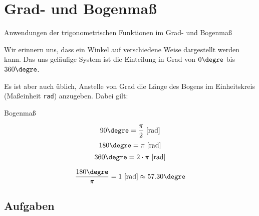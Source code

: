 
\section{Grad- und Bogenmaß}

Anwendungen der trigonometrischen Funktionen im Grad- und Bogenmaß

Wir erinnern uns, dass ein Winkel auf verschiedene Weise dargestellt
werden kann. Das uns geläufige System ist die Einteilung in Grad von
$0\degre$ bis $360\degre$.

Es ist aber auch üblich, Anstelle von Grad die Länge des Bogens im
Einheitskreis (Maßeinheit \texttt{rad}) anzugeben. Dabei gilt:

\begin{gesetz}{Bogenmaß}{}
  
  $$90\degre=\frac{\pi}2 \textrm{ [rad]}$$
  $$180\degre=\pi\textrm{ [rad]}$$
  $$360\degre=2\cdot{}\pi \textrm{ [rad]}$$

  $$\frac{180\degre}{\pi}  =1 \textrm{ [rad]} \approx{} 57.30\degre$$
  
\end{gesetz}

\subsection*{Aufgaben}

\newpage
